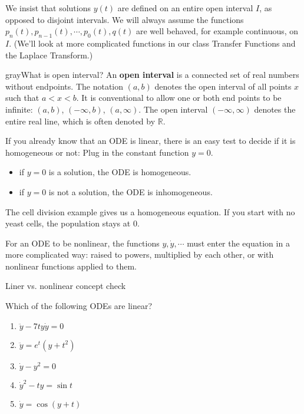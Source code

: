 \begin{remark}
  We insist that solutions $y(t)$ are defined on an entire open interval $I$, as opposed to disjoint intervals.
  We will always assume the functions $p_n(t), p_{n-1}(t), \cdots, p_0(t), q(t)$ are well behaved,
  for example continuous, on $I$.
  (We'll look at more complicated functions in our class Transfer Functions and the Laplace Transform.)
\end{remark}

\begin{mybox}{gray}{What is open interval?}
  An \textbf{\color{blue} open interval} is a connected set of real numbers without endpoints.
  The notation $(a, b)$ denotes the open interval of all points $x$ such that $a < x < b$.
  It is conventional to allow one or both end points to be infinite:
  $(a, b)$, $(- \infty, b)$, $(a, \infty)$.
  The open interval $(-\infty, \infty)$ denotes the entire real line,
  which is often denoted by $\mathbb{R}$.
\end{mybox}

\begin{remark}
  If you already know that an ODE is linear, there is an easy test to decide if it is homogeneous or not:
  Plug in the constant function $y=0$.
\end{remark}
\begin{itemize}
\item if $y = 0$ is a solution, the ODE is homogeneous.
\item if $y = 0$ is not a solution, the ODE is inhomogeneous. 
\end{itemize}

\begin{remark}
  The cell division example gives us a homogeneous equation.
  If you start with no yeast cells, the population stays at $0$.
\end{remark}
For an ODE to be {\color{blue}nonlinear}, the functions $y, \dot{y},\cdots $ must enter the equation in a more complicated way: raised to powers, multiplied by each other, or with nonlinear functions applied to them.

\begin{exercise}
  Liner vs. nonlinear concept check
\end{exercise}
Which of the following ODEs are linear?
\begin{enumerate}
\item $\ddot{y} -7ty \dot{y} = 0$
\item $\ddot{y} = e^t (y+t^2)$
\item $\dot{y} - y^2 = 0$
\item $\dot{y}^2 - t y = \sin t$
\item $\dot{y} = \cos (y+t)$
\end{enumerate}

